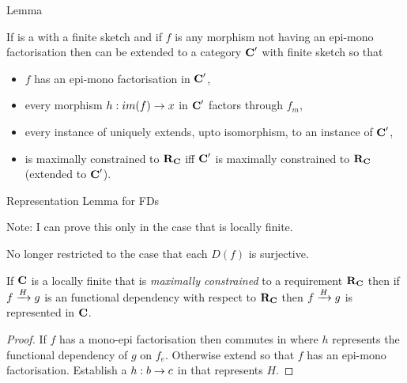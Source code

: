 \begin{frame}{Lemma}
\begin{lemma}
If \catcw is a \catMEterm with a finite sketch and if $f$ is any  morphism 
not having an epi-mono factorisation then \catcw can be extended to a category $\catcp$ with finite sketch so that
\begin{itemize} 
\item $f$ has an epi-mono factorisation in $\catcp$,
\item every morphism $h:im(f) \morph x$ in $\catcp$ factors through $f_m$,
\item every instance of \catcw uniquely extends, upto isomorphism, to an instance of $\catcp$,
\item \catcw is maximally constrained to $\reqtc$ iff $\catcp$ is maximally constrained to $\reqtc$ (extended to $\catcp$).
\end{itemize} 
\end{lemma} 
\end{frame}
\begin{frame}{Representation Lemma for FDs}
{\small Note: I can prove this only in the case that \catcw is locally finite.

No longer restricted to the case that each $D(f)$ is surjective.}

\begin{lemma}
If $\catc$ is a locally finite \catMEterm that is 
\textit{maximally constrained} to a requirement $\reqtc$ then
if $\fundep{H}{f}{g}$  is an   functional dependency with respect to $\reqtc$
then $\fundep{H}{f}{g}$ is represented in $\catc$.
\end{lemma}
\begin{proof} If $f$ has a mono-epi factorisation then
 commutes in \catcw  where $h$ represents 
the functional dependency of $g$ on $f_e$.
Otherwise extend \catcw so that $f$ has an epi-mono factorisation.
Establish a $h: b \morph c$ in \catcw that represents $H$.
\end{proof}
\end{frame}

